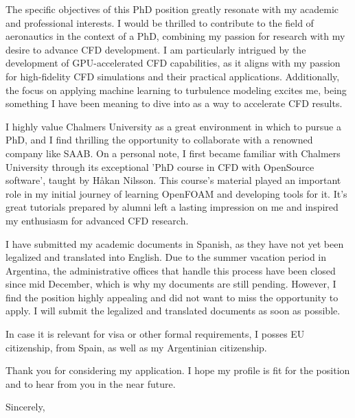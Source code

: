 \documentclass{letter}
\begin{document}
\begin{letter}{}
The specific objectives of this PhD position greatly resonate with my academic and professional interests. 
    I would be thrilled to contribute to the field of aeronautics in the context of a PhD, combining my passion for research with my desire to advance CFD development. 
    I am particularly intrigued by the development of GPU-accelerated CFD capabilities, as it aligns with my passion for high-fidelity CFD simulations and their practical applications. 
    Additionally, the focus on applying machine learning to turbulence modeling excites me, being something I have been meaning to dive into as a way to accelerate CFD results. 

I highly value Chalmers University as a great environment in which to pursue a PhD, and I find thrilling the opportunity to collaborate with a renowned company like SAAB. On a personal note, I first became familiar with Chalmers University through its exceptional 'PhD course in CFD with OpenSource software', taught by Håkan Nilsson. This course's material played an important role in my initial journey of learning OpenFOAM and developing tools for it. It's great tutorials prepared by alumni left a lasting impression on me and inspired my enthusiasm for advanced CFD research.


I have submitted my academic documents in Spanish, as they have not yet been legalized and translated into English. Due to the summer vacation period in Argentina, the administrative offices that handle this process have been closed since mid December, which is why my documents are still pending. However, I find the position highly appealing and did not want to miss the opportunity to apply. I will submit the legalized and translated documents as soon as possible. 
  
  In case it is relevant for visa or other formal requirements, I posses EU citizenship, from Spain, as well as my Argentinian citizenship.

  Thank you for considering my application. I hope my profile is fit for the position and to hear from you in the near future.
\closing{Sincerely,}
\end{letter}
\end{document}
